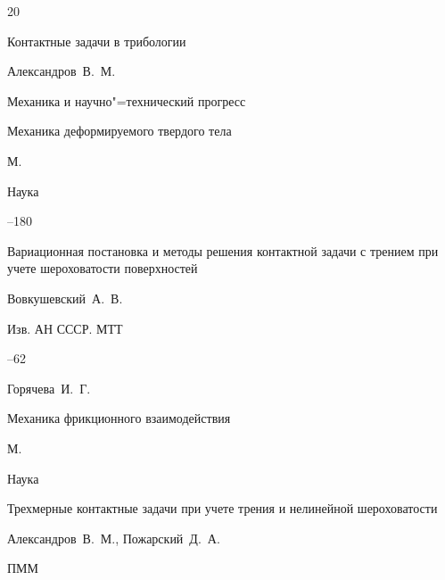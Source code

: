 \RusRef







\begin{thebibliography}{20}




\paper Контактные задачи в трибологии

\by Александров~В.~М.

\inbook Механика и научно"=технический прогресс


\volinfo Механика деформируемого твердого тела


\publaddr М.

\publ Наука

--180






\paper Вариационная постановка и методы решения контактной задачи с трением при учете шероховатости поверхностей

\by Вовкушевский~А.~В.

\jour Изв. АН СССР. МТТ



--62






\by Горячева~И.~Г.

\book Механика фрикционного взаимодействия

\publaddr  М.

\publ Наука








\paper Трехмерные контактные задачи при учете трения и нелинейной шероховатости

\by Александров~В.~М., Пожарский~Д.~А. 

\jour ПММ





\end{thebibliography}
